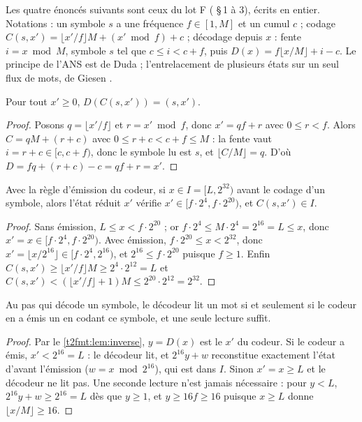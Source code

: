 Les quatre énoncés suivants sont ceux du lot F ( §\,1 à 3), écrits en entier. Notations : un symbole $s$ a une fréquence $f \in [1, M]$ et un cumul $c$ ; codage $C(s, x') = \lfloor x'/f \rfloor M + (x' \bmod f) + c$ ; décodage depuis $x$ : fente $i = x \bmod M$, symbole $s$ tel que $c \le i < c + f$, puis $D(x) = f \lfloor x/M \rfloor + i - c$. Le principe de l'ANS est de Duda \cite{duda2013ans} ; l'entrelacement de plusieurs états sur un seul flux de mots, de Giesen \cite{giesen2014interleaved}.

\begin{lemme}\label{t2fmt:lem:inverse}
Pour tout $x' \ge 0$, $D(C(s, x')) = (s, x')$.
\end{lemme}
\begin{proof}
Posons $q = \lfloor x'/f \rfloor$ et $r = x' \bmod f$, donc $x' = qf + r$ avec $0 \le r < f$. Alors $C = qM + (r + c)$ avec $0 \le r + c < c + f \le M$ : la fente vaut $i = r + c \in [c, c + f)$, donc le symbole lu est $s$, et $\lfloor C/M \rfloor = q$. D'où $D = fq + (r + c) - c = qf + r = x'$.
\end{proof}

\begin{lemme}\label{t2fmt:lem:intervalle}
Avec la règle d'émission du codeur, si $x \in I = [L, 2^{32})$ avant le codage d'un symbole, alors l'état réduit $x'$ vérifie $x' \in [f \cdot 2^4, f \cdot 2^{20})$, et $C(s, x') \in I$.
\end{lemme}
\begin{proof}
Sans émission, $L \le x < f \cdot 2^{20}$ ; or $f \cdot 2^4 \le M \cdot 2^4 = 2^{16} = L \le x$, donc $x' = x \in [f \cdot 2^4, f \cdot 2^{20})$. Avec émission, $f \cdot 2^{20} \le x < 2^{32}$, donc $x' = \lfloor x/2^{16} \rfloor \in [f \cdot 2^4, 2^{16})$, et $2^{16} \le f \cdot 2^{20}$ puisque $f \ge 1$. Enfin $C(s, x') \ge \lfloor x'/f \rfloor M \ge 2^4 \cdot 2^{12} = L$ et $C(s, x') < (\lfloor x'/f \rfloor + 1) M \le 2^{20} \cdot 2^{12} = 2^{32}$.
\end{proof}

\begin{lemme}\label{t2fmt:lem:renorm}
Au pas qui décode un symbole, le décodeur lit un mot si et seulement si le codeur en a émis un en codant ce symbole, et une seule lecture suffit.
\end{lemme}
\begin{proof}
Par le \cref{t2fmt:lem:inverse}, $y = D(x)$ est le $x'$ du codeur. Si le codeur a émis, $x' < 2^{16} = L$ : le décodeur lit, et $2^{16} y + w$ reconstitue exactement l'état d'avant l'émission ($w = x \bmod 2^{16}$), qui est dans $I$. Sinon $x' = x \ge L$ et le décodeur ne lit pas. Une seconde lecture n'est jamais nécessaire : pour $y < L$, $2^{16} y + w \ge 2^{16} = L$ dès que $y \ge 1$, et $y \ge 16 f \ge 16$ puisque $x \ge L$ donne $\lfloor x/M \rfloor \ge 16$.
\end{proof}

